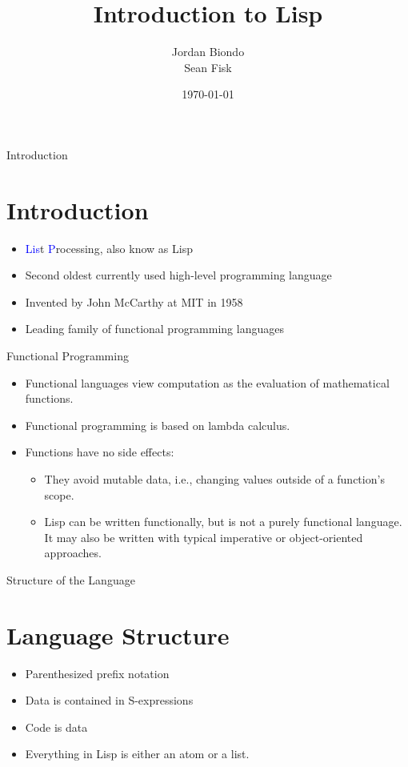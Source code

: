 \documentclass{beamer}
\title[Lisp Introduction]{Introduction to Lisp}
\author{Jordan Biondo \\ Sean Fisk}
\institute{Grand Valley State University}
\date{\today}
\newcommand{\blue}[1]{\textcolor{blue}{#1}}
\begin{document}

\begin{frame}
  \titlepage
\end{frame}

\begin{frame}{Introduction}
  \section{Introduction}
  \begin{itemize}
  \item \blue{Lis}t \blue{P}rocessing, also know as Lisp
  \item Second oldest currently used high-level programming language
  \item Invented by John McCarthy at MIT in 1958
  \item Leading family of functional programming languages
  \end{itemize}
\end{frame}

\begin{frame}{Functional Programming}
  \begin{itemize}
  \item Functional languages view computation as the evaluation of mathematical functions.
  \item Functional programming is based on lambda calculus.
  \item Functions have no side effects:
    \begin{itemize}
    \item They avoid mutable data, i.e., changing values outside of a
      function's scope.
    \item Lisp can be written functionally, but is not a purely
      functional language. It may also be written with typical
      imperative or object-oriented approaches.
    \end{itemize}
  \end{itemize}
\end{frame}

\begin{frame}{Structure of the Language}
\section{Language Structure}
  \begin{itemize}
  \item Parenthesized prefix notation
  \item Data is contained in S-expressions
  \item Code is data
  \item Everything in Lisp is either an atom or a list.
  \end{itemize}
\end{frame}
\end{document}
